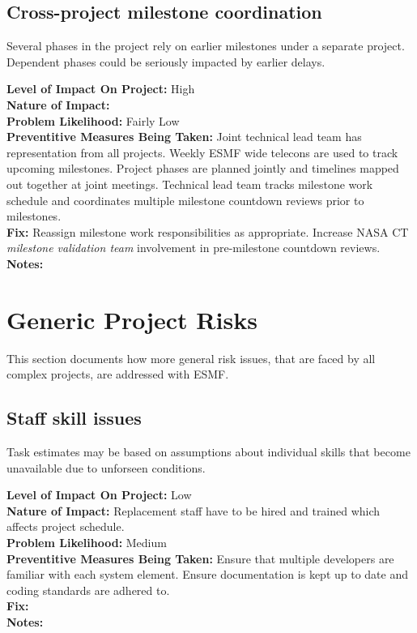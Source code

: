\documentclass[english]{article}
\newcommand{\sreq}[1]{\subsection{\hspace{.2in}#1}}
\newenvironment
{reqlist}
{\begin{list} {} {} \rm \item[]}
{\end{list}}
\begin{document}
\sreq{Cross-project milestone coordination}
Several phases in the project rely on earlier milestones under a separate
project. Dependent phases could be seriously impacted by earlier delays.
\begin{reqlist}
{\bf Level of Impact On Project:} High \\
{\bf Nature of Impact:} \\
{\bf Problem Likelihood:} Fairly Low \\
{\bf Preventitive Measures Being Taken:} Joint technical lead team has representation
from all projects. Weekly ESMF wide telecons are used to track upcoming
milestones. Project phases are planned jointly and timelines mapped out
together at joint meetings. Technical lead team tracks milestone
work schedule and coordinates multiple milestone countdown reviews prior 
to milestones.
\\
{\bf Fix:} Reassign milestone work responsibilities as appropriate.
Increase NASA CT {\it milestone validation team} involvement in pre-milestone
countdown reviews.
\\
{\bf Notes:} 
\end{reqlist}

\section{Generic Project Risks}

This section documents how more general risk issues, that are faced by all complex projects,
are addressed with ESMF.

\sreq{Staff skill issues}
Task estimates may be based on assumptions about individual skills that become unavailable
due to unforseen conditions.
\begin{reqlist}
{\bf Level of Impact On Project:} Low \\
{\bf Nature of Impact:} Replacement staff have to be hired and trained which affects
project schedule.\\
{\bf Problem Likelihood:} Medium \\
{\bf Preventitive Measures Being Taken:} Ensure that multiple developers are familiar
with each system element. Ensure documentation is kept up to date and coding
standards are adhered to.\\
{\bf Fix:} \\
{\bf Notes:} 
\end{reqlist}
\end{document}
